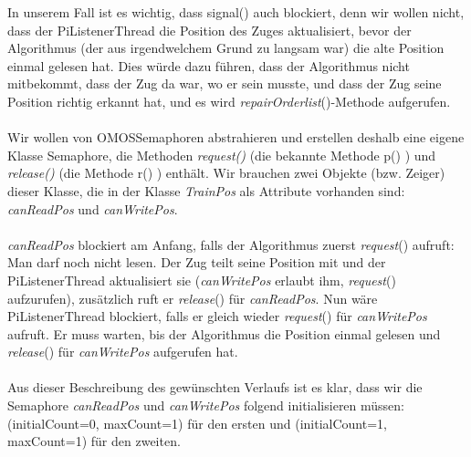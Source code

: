 In unserem Fall ist es wichtig, dass signal() auch blockiert, denn wir wollen nicht, dass der PiListenerThread die Position des Zuges aktualisiert, bevor der Algorithmus (der aus irgendwelchem Grund zu langsam war) die alte Position einmal gelesen hat. Dies würde dazu führen, dass der Algorithmus nicht mitbekommt, dass der Zug da war, wo er sein musste, und dass der Zug seine Position richtig erkannt hat, und es wird \textit{repairOrderlist}()-Methode aufgerufen.\\
\\
Wir wollen von OMOSSemaphoren abstrahieren und erstellen deshalb eine eigene Klasse Semaphore, die Methoden \textit{request()} (die bekannte Methode p() ) und \textit{release()} (die Methode r() ) enthält. Wir brauchen zwei Objekte (bzw. Zeiger) dieser Klasse, die in der Klasse \textit{TrainPos} als Attribute vorhanden sind: \textit{canReadPos} und \textit{canWritePos}.\\
\\
\textit{canReadPos} blockiert am Anfang, falls der Algorithmus zuerst \textit{request}() aufruft: Man darf noch nicht lesen. Der Zug teilt seine Position mit und der PiListenerThread aktualisiert sie (\textit{canWritePos} erlaubt ihm, \textit{request}() aufzurufen), zusätzlich ruft er \textit{release}() für \textit{canReadPos}. Nun wäre PiListenerThread blockiert, falls er gleich wieder \textit{request}() für \textit{canWritePos} aufruft. Er muss warten, bis der Algorithmus die Position einmal gelesen und \textit{release}() für \textit{canWritePos} aufgerufen hat.\\
\\
Aus dieser Beschreibung des gewünschten Verlaufs ist es klar, dass wir die Semaphore \textit{canReadPos} und \textit{canWritePos} folgend initialisieren müssen: (initialCount=0, maxCount=1) für den ersten und (initialCount=1, maxCount=1) für den zweiten.\\
%